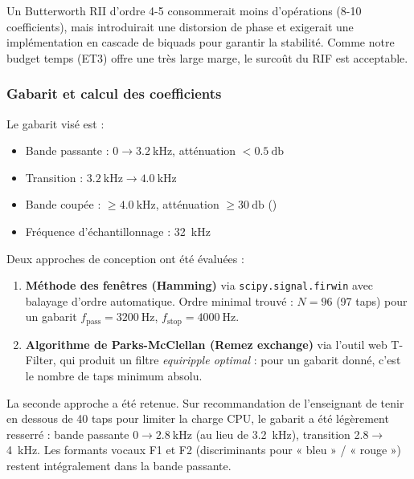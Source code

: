 Un Butterworth RII d'ordre 4-5 consommerait moins d'opérations (8-10 coefficients), mais introduirait une distorsion de phase et exigerait une implémentation en cascade de biquads pour garantir la stabilité. Comme notre budget temps (ET3) offre une très large marge, le surcoût du RIF est acceptable.

\subsubsection{Gabarit et calcul des coefficients}

Le gabarit visé est :
\begin{itemize}
    \item Bande passante : $0 \rightarrow \SI{3.2}{\kilo\hertz}$, atténuation $< \SI{0.5}{\decibel}$
    \item Transition : $\SI{3.2}{\kilo\hertz} \rightarrow \SI{4.0}{\kilo\hertz}$
    \item Bande coupée : $\geq \SI{4.0}{\kilo\hertz}$, atténuation $\geq \SI{30}{\decibel}$ ()
    \item Fréquence d'échantillonnage : \SI{32}{\kilo\hertz}
\end{itemize}

Deux approches de conception ont été évaluées :

\begin{enumerate}
    \item \textbf{Méthode des fenêtres (Hamming)} via \verb|scipy.signal.firwin| avec balayage d'ordre automatique. Ordre minimal trouvé : $N = 96$ (97 taps) pour un gabarit $f_{\text{pass}} = \SI{3200}{\hertz}$, $f_{\text{stop}} = \SI{4000}{\hertz}$.
    \item \textbf{Algorithme de Parks-McClellan (Remez exchange)} via l'outil web T-Filter, qui produit un filtre \emph{equiripple optimal} : pour un gabarit donné, c'est le nombre de taps minimum absolu.
\end{enumerate}

La seconde approche a été retenue. Sur recommandation de l'enseignant de tenir en dessous de 40 taps pour limiter la charge CPU, le gabarit a été légèrement resserré : bande passante $0 \rightarrow \SI{2.8}{\kilo\hertz}$ (au lieu de \SI{3.2}{\kilo\hertz}), transition \SI{2.8}{}$\rightarrow$\SI{4}{\kilo\hertz}. Les formants vocaux F1 et F2 (discriminants pour « bleu » / « rouge ») restent intégralement dans la bande passante.

